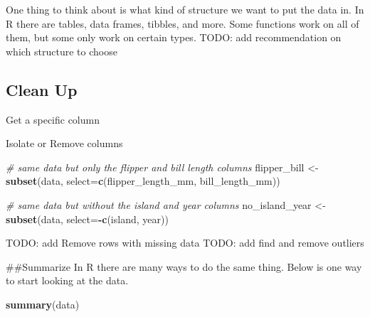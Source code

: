 \documentclass[
]{article}
\newenvironment{Shaded}{\begin{snugshade}}{\end{snugshade}}
\newcommand{\AttributeTok}[1]{\textcolor[rgb]{0.13,0.29,0.53}{#1}}
\newcommand{\CommentTok}[1]{\textcolor[rgb]{0.56,0.35,0.01}{\textit{#1}}}
\newcommand{\FunctionTok}[1]{\textcolor[rgb]{0.13,0.29,0.53}{\textbf{#1}}}
\newcommand{\NormalTok}[1]{#1}
\newcommand{\OtherTok}[1]{\textcolor[rgb]{0.56,0.35,0.01}{#1}}
\newcommand{\SpecialCharTok}[1]{\textcolor[rgb]{0.81,0.36,0.00}{\textbf{#1}}}
\begin{document}
One thing to think about is what kind of structure we want to put the
data in. In R there are tables, data frames, tibbles, and more. Some
functions work on all of them, but some only work on certain types.
TODO: add recommendation on which structure to choose

\hypertarget{clean-up}{%
\subsection{Clean Up}\label{clean-up}}

Get a specific column

\begin{Shaded}
\end{Shaded}

Isolate or Remove columns

\begin{Shaded}
\begin{Highlighting}[]
\CommentTok{\# same data but only the flipper and bill length columns}
\NormalTok{flipper\_bill }\OtherTok{\textless{}{-}} \FunctionTok{subset}\NormalTok{(data, }\AttributeTok{select=}\FunctionTok{c}\NormalTok{(flipper\_length\_mm, bill\_length\_mm))}

\CommentTok{\# same data but without the island and year columns}
\NormalTok{no\_island\_year }\OtherTok{\textless{}{-}} \FunctionTok{subset}\NormalTok{(data, }\AttributeTok{select=}\SpecialCharTok{{-}}\FunctionTok{c}\NormalTok{(island, year))}
\end{Highlighting}
\end{Shaded}

TODO: add Remove rows with missing data TODO: add find and remove
outliers

\#\#Summarize In R there are many ways to do the same thing. Below is
one way to start looking at the data.

\begin{Shaded}
\begin{Highlighting}[]
\FunctionTok{summary}\NormalTok{(data)}
\end{Highlighting}
\end{Shaded}
\end{document}
